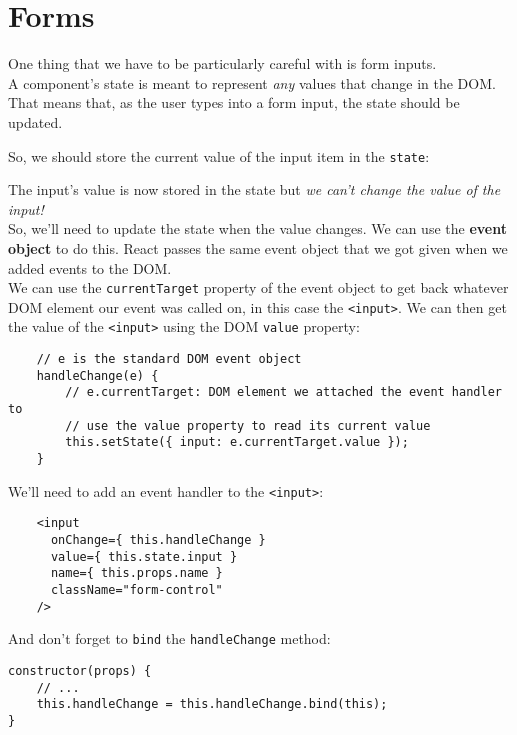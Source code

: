 \section{Forms}

One thing that we have to be particularly careful with is form inputs.
\\

A component's state is meant to represent \textit{any} values that change in the DOM. That means that, as the user types into a form input, the state should be updated.



\pagebreak


So, we should store the current value of the input item in the \texttt{state}:


The input's value is now stored in the state but \textit{we can't change the value of the input!}
\\

So, we'll need to update the state when the value changes. We can use the \textbf{event object} to do this. React passes the same event object that we got given when we added events to the DOM.
\\

We can use the \texttt{currentTarget} property of the event object to get back whatever DOM element our event was called on, in this case the \texttt{<input>}. We can then get the value of the \texttt{<input>} using the DOM \texttt{value} property:

\begin{verbatim}
    // e is the standard DOM event object
    handleChange(e) {
        // e.currentTarget: DOM element we attached the event handler to
        // use the value property to read its current value
        this.setState({ input: e.currentTarget.value });
    }
\end{verbatim}

We'll need to add an event handler to the \texttt{<input>}:

\begin{verbatim}
    <input
      onChange={ this.handleChange }
      value={ this.state.input }
      name={ this.props.name }
      className="form-control"
    />
\end{verbatim}

And don't forget to \texttt{bind} the \texttt{handleChange} method:

\begin{verbatim}
constructor(props) {
    // ...
    this.handleChange = this.handleChange.bind(this);
}
\end{verbatim}

